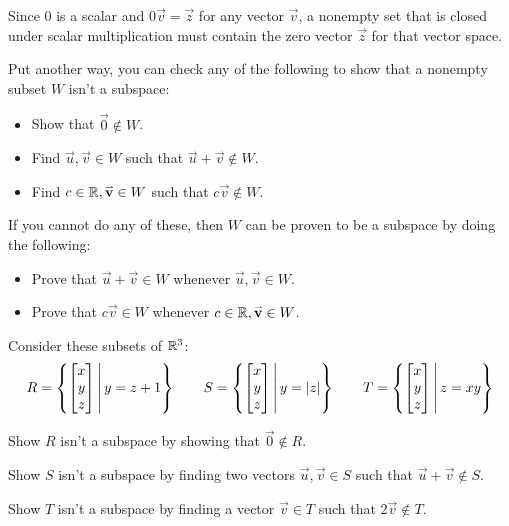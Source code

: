 \begin{remark}
Since \(0\) is a scalar and \(0\vec{v}=\vec{z}\) for any vector \(\vec{v}\), a
nonempty set that is closed under scalar multiplication must contain the zero vector
\(\vec{z}\) for that vector space.

\vspace{1em}

Put another way, you can check any of the following to show that a
nonempty subset \(W\) isn't a subspace:

\begin{itemize}
  \item Show that \(\vec 0\not\in W\). 
  \item Find \(\vec u,\vec v\in W\) such that \(\vec u+\vec v\not\in W\).
  \item Find \(c\in\mathbb{R},\mathbf{\accentset{\rightharpoonup}{v}}\in W\) such that \(c\vec v\not\in W\).
\end{itemize}

If you cannot do any of these, then \(W\) can be proven to be a subspace
by doing the following:
\begin{itemize}
  \item Prove that \(\vec u+\vec v\in W\) whenever \(\vec u,\vec v\in W\).
  \item Prove that \(c\vec v\in W\) whenever \(c\in\mathbb{R},\mathbf{\accentset{\rightharpoonup}{v}}\in W\).
\end{itemize}
\end{remark}

\begin{activity}{20}
  Consider these subsets of \(\mathbb{R}^3\):
  \[
    R=
    \left\{ \begin{bmatrix}x\\y\\z\end{bmatrix}\,\middle|\,y=z+1\right\}
    \hspace{2em}
    S=
    \left\{ \begin{bmatrix}x\\y\\z\end{bmatrix}\,\middle|\,y=|z|\right\}
    \hspace{2em}
    T=
    \left\{ \begin{bmatrix}x\\y\\z\end{bmatrix}\,\middle|\,z=xy\right\}
  \]
  \begin{subactivity}
  Show \(R\) isn't a subspace by showing that \(\vec 0\not\in R\).
  \end{subactivity}
  \begin{subactivity}
  Show \(S\) isn't a subspace by finding two vectors \(\vec u,\vec v\in S\)
  such that \(\vec u+\vec v\not\in S\).
  \end{subactivity}
  \begin{subactivity}
  Show \(T\) isn't a subspace by finding a vector \(\vec v\in T\)
  such that \(2\vec v\not\in T\).
  \end{subactivity}
\end{activity}



